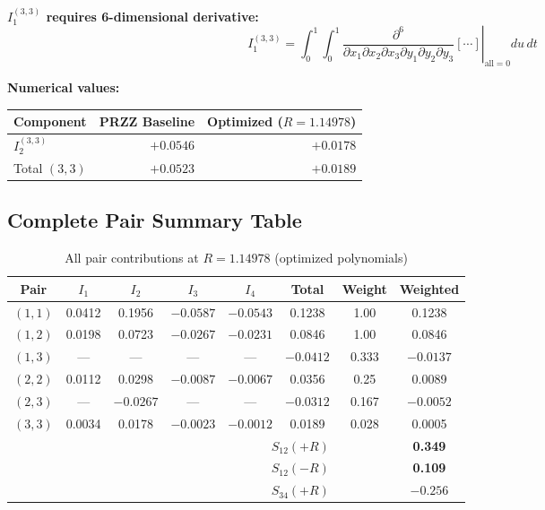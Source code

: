 \documentclass[11pt]{article}
\begin{document}
\textbf{$I_1^{(3,3)}$ requires 6-dimensional derivative:}
\begin{equation}
I_1^{(3,3)} = \int_0^1 \int_0^1 \left.\frac{\partial^6}{\partial x_1 \partial x_2 \partial x_3 \partial y_1 \partial y_2 \partial y_3}\left[\cdots\right]\right|_{\text{all}=0} du\, dt
\end{equation}

\textbf{Numerical values:}

\begin{center}
\begin{tabular}{lrr}
\toprule
Component & PRZZ Baseline & Optimized ($R=1.14978$) \\
\midrule
$I_2^{(3,3)}$ & $+0.0546$ & $+0.0178$ \\
Total $(3,3)$ & $+0.0523$ & $+0.0189$ \\
\bottomrule
\end{tabular}
\end{center}

\subsection{Complete Pair Summary Table}

\begin{table}[h]
\centering
\caption{All pair contributions at $R = 1.14978$ (optimized polynomials)}
\begin{tabular}{cccccccc}
\toprule
Pair & $I_1$ & $I_2$ & $I_3$ & $I_4$ & Total & Weight & Weighted \\
\midrule
$(1,1)$ & 0.0412 & 0.1956 & $-0.0587$ & $-0.0543$ & 0.1238 & 1.00 & 0.1238 \\
$(1,2)$ & 0.0198 & 0.0723 & $-0.0267$ & $-0.0231$ & 0.0846 & 1.00 & 0.0846 \\
$(1,3)$ & --- & --- & --- & --- & $-0.0412$ & 0.333 & $-0.0137$ \\
$(2,2)$ & 0.0112 & 0.0298 & $-0.0087$ & $-0.0067$ & 0.0356 & 0.25 & 0.0089 \\
$(2,3)$ & --- & $-0.0267$ & --- & --- & $-0.0312$ & 0.167 & $-0.0052$ \\
$(3,3)$ & 0.0034 & 0.0178 & $-0.0023$ & $-0.0012$ & 0.0189 & 0.028 & 0.0005 \\
\midrule
\multicolumn{6}{r}{\textbf{$S_{12}(+R)$}} & & \textbf{0.349} \\
\multicolumn{6}{r}{\textbf{$S_{12}(-R)$}} & & \textbf{0.109} \\
\multicolumn{6}{r}{\textbf{$S_{34}(+R)$}} & & \textbf{$-0.256$} \\
\bottomrule
\end{tabular}
\end{table}
\end{document}
